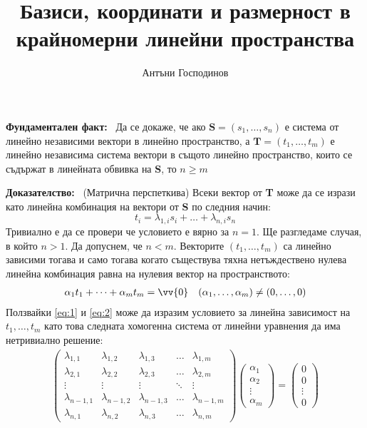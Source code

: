 \documentclass[a4paper,12pt,fleqn]{article}
\title{Базиси, координати и размерност в крайномерни линейни пространства}
\author{Антъни Господинов}
\date{}
\begin{document}
\maketitle

    \textbf{Фундаментален факт:}~%
      Да се докаже, че ако \( \textbf{S}=\left( s_{1},\dots,s_{n} \right) \) е система от линейно независими вектори в линейно пространство, а \( \textbf{T}=\left( t_{1},\dots,t_{m} \right) \) е линейно независима система вектори в същото линейно пространство, които се съдържат в линейната обвивка на \textbf{S}, то \( n \geq m \)
    

    \textbf{Доказателство:}~%
      (Матрична перспеткива)
      Всеки вектор от \textbf{T} може да се изрази като линейна комбинация на вектори от \textbf{S} по следния начин:
      \begin{equation} \label{eq:1}
        t_{i}=\lambda_{1,i} s_{i} + \dots + \lambda_{n,i} s_{n}
      \end{equation}
      Тривиално е да се провери че условието е вярно за \( n=1 \).
      Ще разгледаме случая, в който \( n > 1 \). Да допуснем, че \( n<m \). Векторите \( (t_{1},\dots,t_{m}) \) са линейно зависими тогава и само тогава когато съществува тяхна нетъждествено нулева линейна комбинация равна на нулевия вектор на пространството:
      \begin{align} \label{eq:2}
        \alpha_{1}t_{1}+\dots+\alpha_{m}t_{m}=\vv{0} && \left( \alpha_{1},\dots,\alpha_{m} \right) \neq \left( 0,\dots,0 \right)
      \end{align} 
      Ползвайки \eqref{eq:1} и \eqref{eq:2} може да изразим условието за линейна зависимост на \( t_{1},\dots,t_{m} \) като това следната хомогенна система от линейни уравнения да има нетривиално решение:
      \begin{gather}\label{eq:3}
        \begin{pmatrix}
          \lambda_{1, 1} & \lambda_{1, 2} & \lambda_{1, 3} & \dots & \lambda_{1, m} \\
          \lambda_{2, 1} & \lambda_{2, 2} & \lambda_{2, 3} & \dots & \lambda_{2, m} \\
          \vdots & \vdots & \vdots & \ddots & \vdots \\
          \lambda_{n-1, 1} & \lambda_{n-1, 2} & \lambda_{n-1, 3} & \dots & \lambda_{n-1, m}  \\
          \lambda_{n, 1} & \lambda_{n, 2} & \lambda_{n, 3} & \dots & \lambda_{n, m} 
        \end{pmatrix}
        \begin{pmatrix}
          \alpha_{1} \\
          \alpha_{2} \\
          \vdots \\
          \alpha_{m}
        \end{pmatrix}
        =
        \begin{pmatrix}
          0 \\
          0 \\
          \vdots \\
          0
        \end{pmatrix}
      \end{gather}
\end{document}
